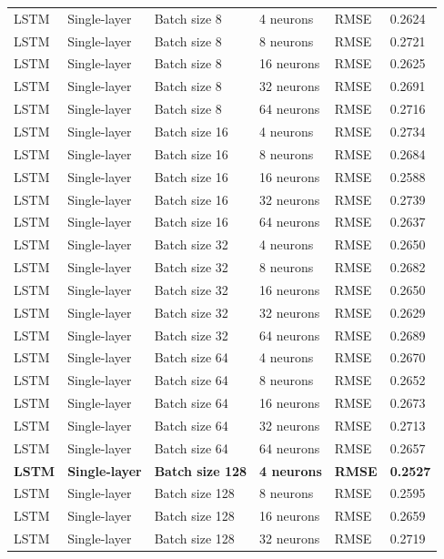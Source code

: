 \begin{landscape}
\begin{longtable}{p{2.2cm}p{3cm}p{3.5cm}p{3.2cm}p{1.6cm}p{1.8cm}}
LSTM & Single-layer & Batch size 8   & 4 neurons  & RMSE & 0.2624 \\
LSTM & Single-layer & Batch size 8   & 8 neurons  & RMSE & 0.2721 \\
LSTM & Single-layer & Batch size 8   & 16 neurons & RMSE & 0.2625 \\
LSTM & Single-layer & Batch size 8   & 32 neurons & RMSE & 0.2691 \\
LSTM & Single-layer & Batch size 8   & 64 neurons & RMSE & 0.2716 \\
LSTM & Single-layer & Batch size 16  & 4 neurons  & RMSE & 0.2734 \\
LSTM & Single-layer & Batch size 16  & 8 neurons  & RMSE & 0.2684 \\
LSTM & Single-layer & Batch size 16  & 16 neurons & RMSE & 0.2588 \\
LSTM & Single-layer & Batch size 16  & 32 neurons & RMSE & 0.2739 \\
LSTM & Single-layer & Batch size 16  & 64 neurons & RMSE & 0.2637 \\
LSTM & Single-layer & Batch size 32  & 4 neurons  & RMSE & 0.2650 \\
LSTM & Single-layer & Batch size 32  & 8 neurons  & RMSE & 0.2682 \\
LSTM & Single-layer & Batch size 32  & 16 neurons & RMSE & 0.2650 \\
LSTM & Single-layer & Batch size 32  & 32 neurons & RMSE & 0.2629 \\
LSTM & Single-layer & Batch size 32  & 64 neurons & RMSE & 0.2689 \\
LSTM & Single-layer & Batch size 64  & 4 neurons  & RMSE & 0.2670 \\
LSTM & Single-layer & Batch size 64  & 8 neurons  & RMSE & 0.2652 \\
LSTM & Single-layer & Batch size 64  & 16 neurons & RMSE & 0.2673 \\
LSTM & Single-layer & Batch size 64  & 32 neurons & RMSE & 0.2713 \\
LSTM & Single-layer & Batch size 64  & 64 neurons & RMSE & 0.2657 \\
\textbf{LSTM} & \textbf{Single-layer} & \textbf{Batch size 128} & \textbf{4 neurons} & \textbf{RMSE} & \textbf{0.2527} \\
LSTM & Single-layer & Batch size 128 & 8 neurons  & RMSE & 0.2595 \\
LSTM & Single-layer & Batch size 128 & 16 neurons & RMSE & 0.2659 \\
LSTM & Single-layer & Batch size 128 & 32 neurons & RMSE & 0.2719 \\

\end{longtable}
\end{landscape}
